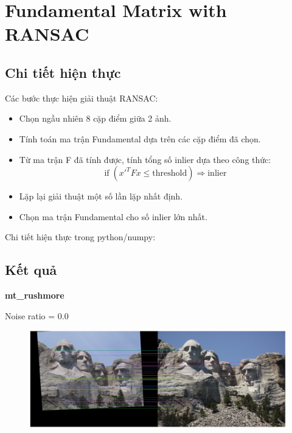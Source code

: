 \documentclass[11pt]{article}
\begin{document}
\section*{Fundamental Matrix with RANSAC}
\subsection*{Chi tiết hiện thực}
Các bước thực hiện giải thuật RANSAC:
\begin{itemize}
    \item Chọn ngầu nhiên 8 cặp điểm giữa 2 ảnh.
    \item Tính toán ma trận Fundamental dựa trên các cặp điểm đã chọn.
    \item Từ ma trận F đã tính được, tính tổng số inlier dựa theo công thức:
        \begin{equation*}
            \text{if} \; (x'^T F x \leq \text{threshold}) \Rightarrow \text{inlier}
        \end{equation*}
    \item Lặp lại giải thuật một số lần lặp nhất định.
    \item Chọn ma trận Fundamental cho số inlier lớn nhất.
\end{itemize}

Chi tiết hiện thực trong python/numpy:

\subsection*{Kết quả}
\textbf{mt\_rushmore}

Noise ratio = 0.0
\begin{figure}[H]
    \centering
    \includegraphics[width=14cm]{images/part3/ransac_image_1_noise_0.0_1.png}
\end{figure}
\end{document}
